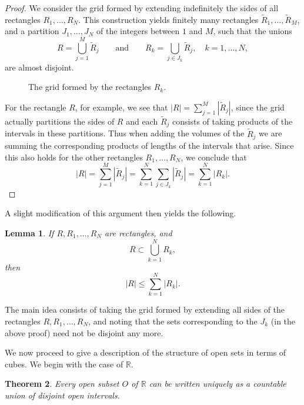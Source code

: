 \documentclass[11pt,openany]{book}
\newtheorem{theorem}{Theorem}[section]
\newtheorem{lemma}[theorem]{Lemma}
\begin{document}
\begin{proof}
We consider the grid formed by extending indefinitely the sides of all rectangles $R_1,\ldots,R_N$. This construction yields finitely many rectangles $\widetilde R_1,\ldots,\widetilde R_M$, and a partition $J_1,\ldots,J_N$ of the integers between $1$ and $M$, such that the unions
\[
 R=\bigcup_{j=1}^M \widetilde R_j
 \qquad\text{and}\qquad
 R_k=\bigcup_{j\in J_k}\widetilde R_j,\quad k=1,\ldots,N,
\]
are almost disjoint.

\begin{figure}[ht]
\centering
{}
\caption{The grid formed by the rectangles $R_k$.}
\end{figure}

For the rectangle $R$, for example, we see that $|R|=\sum_{j=1}^M|\widetilde R_j|$, since the grid actually partitions the sides of $R$ and each $\widetilde R_j$ consists of taking products of the intervals in these partitions. Thus when adding the volumes of the $\widetilde R_j$ we are summing the corresponding products of lengths of the intervals that arise. Since this also holds for the other rectangles $R_1,\ldots,R_N$, we conclude that
\[
 |R|=\sum_{j=1}^M|\widetilde R_j|
 =\sum_{k=1}^N\sum_{j\in J_k}|\widetilde R_j|
 =\sum_{k=1}^N|R_k|.
\]
\end{proof}

A slight modification of this argument then yields the following.

\begin{lemma}
If $R,R_1,\ldots,R_N$ are rectangles, and
\[
 R\subset\bigcup_{k=1}^N R_k,
\]
then
\[
 |R|\le \sum_{k=1}^N |R_k|.
\]
\end{lemma}

The main idea consists of taking the grid formed by extending all sides of the rectangles $R,R_1,\ldots,R_N$, and noting that the sets corresponding to the $J_k$ (in the above proof) need not be disjoint any more.

We now proceed to give a description of the structure of open sets in terms of cubes. We begin with the case of $\mathbb{R}$.

\begin{theorem}
Every open subset $O$ of $\mathbb{R}$ can be written uniquely as a countable union of disjoint open intervals.
\end{theorem}
\end{document}
